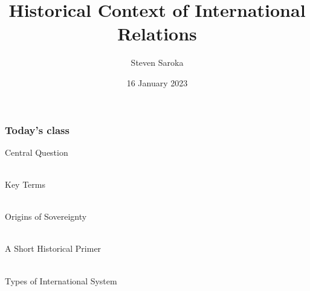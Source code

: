 \documentclass[handout]{beamer}
\title[Historical Context]{\LARGE{Historical Context of International Relations}}
\author[POLI 150]{Steven Saroka}
\institute{POLI 150}
\date{16 January 2023}
\begin{document}
\begin{frame}
\titlepage %
\end{frame}





\begin{frame} 
	\frametitle{\LARGE{Today's class}}
	\begin{itemize}
		\Large{
			\item Central Question
			\\~\\ 
			\item Key Terms
			\\~\\
			\item Origins of Sovereignty
			\\~\\
			\item A Short Historical Primer
			\\~\\
			\item Types of International System
		}
	\end{itemize}
\end{frame}

\end{document}
